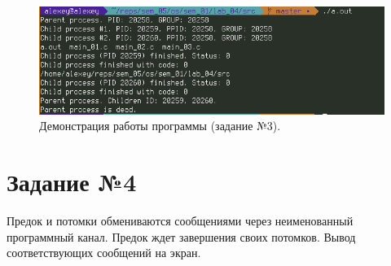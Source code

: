 \documentclass[12pt]{report}
\begin{document}
\begin{figure}[H]

	\centering

	\includegraphics[width=\linewidth]{img/task03.png}
	\caption{Демонстрация работы программы (задание №3).}

	\label{fig:task03}

\end{figure}

\section*{Задание №4}

Предок и потомки обмениваются сообщениями через неименованный
программный канал. Предок ждет завершения своих потомков. Вывод соответствующих сообщений на экран.
\end{document}
